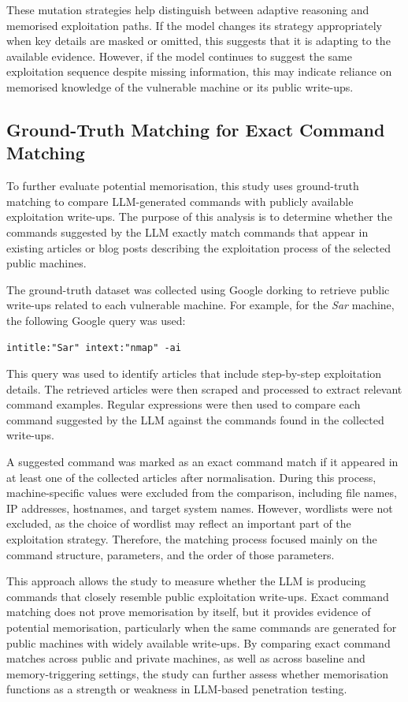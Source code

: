 \documentclass[acmtog]{acmart}
\begin{document}
These mutation strategies help distinguish between adaptive reasoning and memorised exploitation paths. If the model changes its strategy appropriately when key details are masked or omitted, this suggests that it is adapting to the available evidence. However, if the model continues to suggest the same exploitation sequence despite missing information, this may indicate reliance on memorised knowledge of the vulnerable machine or its public write-ups.

\subsection{Ground-Truth Matching for Exact Command Matching}

To further evaluate potential memorisation, this study uses ground-truth matching to compare LLM-generated commands with publicly available exploitation write-ups. The purpose of this analysis is to determine whether the commands suggested by the LLM exactly match commands that appear in existing articles or blog posts describing the exploitation process of the selected public machines.

The ground-truth dataset was collected using Google dorking to retrieve public write-ups related to each vulnerable machine. For example, for the \textit{Sar} machine, the following Google query was used:

\begin{verbatim}
intitle:"Sar" intext:"nmap" -ai
\end{verbatim}

This query was used to identify articles that include step-by-step exploitation details. The retrieved articles were then scraped and processed to extract relevant command examples. Regular expressions were then used to compare each command suggested by the LLM against the commands found in the collected write-ups.

A suggested command was marked as an exact command match if it appeared in at least one of the collected articles after normalisation. During this process, machine-specific values were excluded from the comparison, including file names, IP addresses, hostnames, and target system names. However, wordlists were not excluded, as the choice of wordlist may reflect an important part of the exploitation strategy. Therefore, the matching process focused mainly on the command structure, parameters, and the order of those parameters.

This approach allows the study to measure whether the LLM is producing commands that closely resemble public exploitation write-ups. Exact command matching does not prove memorisation by itself, but it provides evidence of potential memorisation, particularly when the same commands are generated for public machines with widely available write-ups. By comparing exact command matches across public and private machines, as well as across baseline and memory-triggering settings, the study can further assess whether memorisation functions as a strength or weakness in LLM-based penetration testing.
\end{document}
